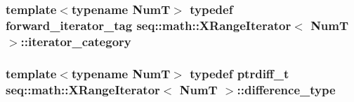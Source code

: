 \hypertarget{classseq_1_1math_1_1_x_range_iterator_afa575aa34d0b2740ccfbd9ca512309a0}{
\subsubsection[{iterator\-\_\-category}]{\setlength{\rightskip}{0pt plus 5cm}template$<$typename Num\-T$>$ typedef forward\-\_\-iterator\-\_\-tag {\bf seq\-::math\-::\-X\-Range\-Iterator}$<$ Num\-T $>$\-::{\bf iterator\-\_\-category}}}\label{classseq_1_1math_1_1_x_range_iterator_afa575aa34d0b2740ccfbd9ca512309a0}
\hypertarget{classseq_1_1math_1_1_x_range_iterator_aff997a44dcd04a95ae2e0255d9cdaf43}{
\subsubsection[{difference\-\_\-type}]{\setlength{\rightskip}{0pt plus 5cm}template$<$typename Num\-T$>$ typedef ptrdiff\-\_\-t {\bf seq\-::math\-::\-X\-Range\-Iterator}$<$ Num\-T $>$\-::{\bf difference\-\_\-type}}}\label{classseq_1_1math_1_1_x_range_iterator_aff997a44dcd04a95ae2e0255d9cdaf43}


